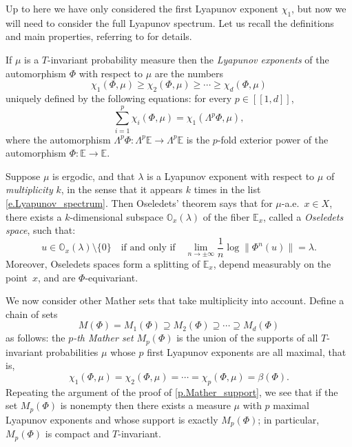 \documentclass[JEP,XML,SOM,Unicode]{cedram}
\newcommand{\ldbrack}{[\![}
\newcommand{\rdbrack}{]\!]}
\theoremstyle{plain}
\theoremstyle{definition}
\newcommand{\EE}{\mathbb{E}}
\newcommand{\WEDGE}{\mathsf{\Lambda}}
\begin{document}
Up to here we have only considered the first Lyapunov exponent $\chi_1$, but now we will need to consider the full Lyapunov spectrum. Let us recall the definitions and main properties, referring to \cite{Arnold} for details.

If $\mu$ is a $T$-invariant probability measure then the \emph{Lyapunov exponents} of the automorphism $\Phi$ with respect to $\mu$ are the numbers
\begin{equation}\label{e.Lyapunov_spectrum}
\chi_1(\Phi,\mu) \ge \chi_2(\Phi,\mu) \ge \cdots \ge \chi_d(\Phi,\mu)
\end{equation}
uniquely defined by the following equations: for every $p \in \ldbrack 1,d \rdbrack$,
\begin{equation}\label{e.Lyapunov_wedge}
\sum_{i=1}^p \chi_i(\Phi,\mu) =
\chi_1(\WEDGE^p \Phi, \mu),
\end{equation}
where the automorphism $\WEDGE^p \Phi \colon \WEDGE^p \EE \to \WEDGE^p \EE$ is the $p$-fold exterior power of the automorphism ${\Phi \colon \EE \to \EE}$.

Suppose $\mu$ is ergodic, and that $\lambda$ is a Lyapunov exponent with respect to $\mu$ of \emph{multiplicity} $k$, in the sense that it appears $k$ times in the list \eqref{e.Lyapunov_spectrum}.
Then Oseledets' theorem says that for $\mu$-a.e.\ $x\in X$, there exists a $k$-dimensional subspace $\mathbb{O}_x(\lambda)$ of the fiber $\EE_x$, called a \emph{Oseledets space}, such that:
\[
u \in \mathbb{O}_x(\lambda) \setminus \{0\} \quad \text{if and only if} \quad
\lim_{n \to \pm \infty} \frac{1}{n} \log \|\Phi^n(u)\| = \lambda.
\]
Moreover, Oseledets spaces form a splitting of $\EE_x$, depend measurably on the point~$x$, and are $\Phi$-equivariant.

We now consider other Mather sets that take multiplicity into account.
Define a chain of sets
\begin{equation}\label{e.chain_Mathers}
M(\Phi) = M_1(\Phi) \supseteq M_2(\Phi) \supseteq \cdots \supseteq M_d(\Phi)
\end{equation}
as follows: the \emph{$p$-th Mather set} $M_p(\Phi)$ is the union of the supports of all $T$-invariant probabilities $ \mu $ whose $p$ first Lyapunov exponents are all maximal, that is,
\[
\chi_1(\Phi,\mu) = \chi_2(\Phi,\mu) = \cdots = \chi_p(\Phi,\mu) = \beta(\Phi).
\]
Repeating the argument of the proof of \cref{p.Mather_support}, we see that if the set $M_p(\Phi)$ is nonempty then there exists a measure $\mu$ with $p$ maximal Lyapunov exponents and whose support is exactly $M_p(\Phi)$; in particular, $M_p(\Phi)$ is compact and $T$-invariant.
\end{document}

